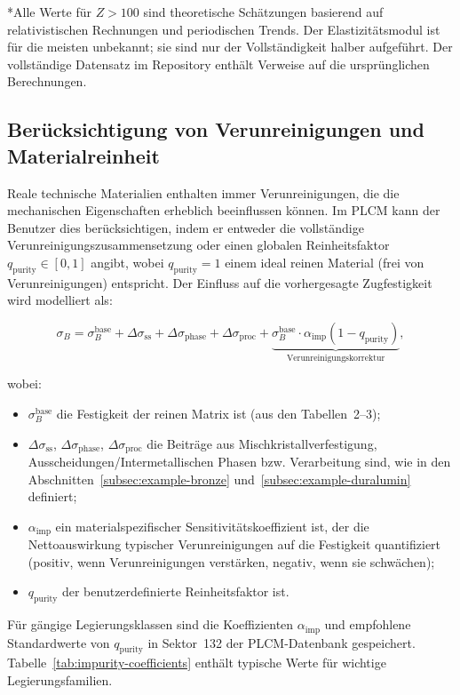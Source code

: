 \documentclass[12pt,a4paper]{article}
\begin{document}
	*Alle Werte für \(Z>100\) sind theoretische Schätzungen basierend auf relativistischen Rechnungen und periodischen Trends. Der Elastizitätsmodul ist für die meisten unbekannt; sie sind nur der Vollständigkeit halber aufgeführt. Der vollständige Datensatz im Repository enthält Verweise auf die ursprünglichen Berechnungen.
	
	\subsection{Berücksichtigung von Verunreinigungen und Materialreinheit}
	\label{subsec:purity}
	
	Reale technische Materialien enthalten immer Verunreinigungen, die die mechanischen Eigenschaften erheblich beeinflussen können. Im PLCM kann der Benutzer dies berücksichtigen, indem er entweder die vollständige Verunreinigungszusammensetzung oder einen globalen Reinheitsfaktor \(q_{\mathrm{purity}} \in [0,1]\) angibt, wobei \(q_{\mathrm{purity}}=1\) einem ideal reinen Material (frei von Verunreinigungen) entspricht. Der Einfluss auf die vorhergesagte Zugfestigkeit wird modelliert als:
	
	\[
	\sigma_B = \sigma_B^{\mathrm{base}} + \Delta\sigma_{\mathrm{ss}} + \Delta\sigma_{\mathrm{phase}} + \Delta\sigma_{\mathrm{proc}} + \underbrace{\sigma_B^{\mathrm{base}} \cdot \alpha_{\mathrm{imp}} (1 - q_{\mathrm{purity}})}_{\text{Verunreinigungskorrektur}},
	\]
	
	wobei:
	\begin{itemize}
		\item \(\sigma_B^{\mathrm{base}}\) die Festigkeit der reinen Matrix ist (aus den Tabellen~2–3);
		\item \(\Delta\sigma_{\mathrm{ss}}\), \(\Delta\sigma_{\mathrm{phase}}\), \(\Delta\sigma_{\mathrm{proc}}\) die Beiträge aus Mischkristallverfestigung, Ausscheidungen/Intermetallischen Phasen bzw. Verarbeitung sind, wie in den Abschnitten~\ref{subsec:example-bronze} und~\ref{subsec:example-duralumin} definiert;
		\item \(\alpha_{\mathrm{imp}}\) ein materialspezifischer Sensitivitätskoeffizient ist, der die Nettoauswirkung typischer Verunreinigungen auf die Festigkeit quantifiziert (positiv, wenn Verunreinigungen verstärken, negativ, wenn sie schwächen);
		\item \(q_{\mathrm{purity}}\) der benutzerdefinierte Reinheitsfaktor ist.
	\end{itemize}
	
	Für gängige Legierungsklassen sind die Koeffizienten \(\alpha_{\mathrm{imp}}\) und empfohlene Standardwerte von \(q_{\mathrm{purity}}\) in Sektor~132 der PLCM-Datenbank gespeichert. Tabelle~\ref{tab:impurity-coefficients} enthält typische Werte für wichtige Legierungsfamilien.
	
\end{document}
